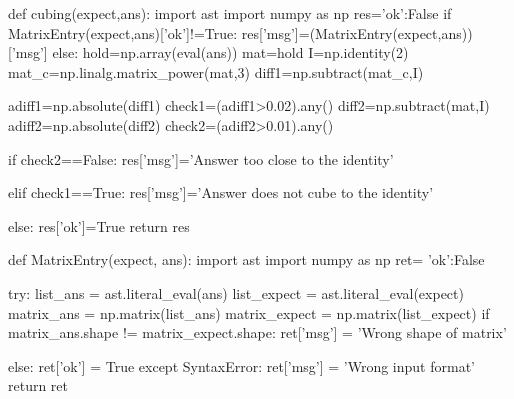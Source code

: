 
\begin{edXscript}
def cubing(expect,ans):
    import ast
    import numpy as np
    res={'ok':False}
    if MatrixEntry(expect,ans)['ok']!=True:
        res['msg']=(MatrixEntry(expect,ans))['msg']
    else:
        hold=np.array(eval(ans))
        mat=hold
        I=np.identity(2)
        mat_c=np.linalg.matrix_power(mat,3)
        diff1=np.subtract(mat_c,I)
    
        adiff1=np.absolute(diff1)
        check1=(adiff1>0.02).any()
        diff2=np.subtract(mat,I)
        adiff2=np.absolute(diff2)
        check2=(adiff2>0.01).any()
    

        if check2==False:
            res['msg']='Answer too close to the identity'
            
        elif check1==True:
            res['msg']='Answer does not cube to the identity'
            
        else:
            res['ok']=True
    return res
  
def MatrixEntry(expect, ans):
    import ast
    import numpy as np
    ret= {'ok':False}
    
    
    try:
        list_ans = ast.literal_eval(ans)
        list_expect = ast.literal_eval(expect)
        matrix_ans = np.matrix(list_ans)
        matrix_expect = np.matrix(list_expect)
        if matrix_ans.shape != matrix_expect.shape:
            ret['msg'] = 'Wrong shape of matrix'
        
        else:
            ret['ok'] = True
    except SyntaxError:
        ret['msg'] = 'Wrong input format'
    return ret
\end{edXscript}
